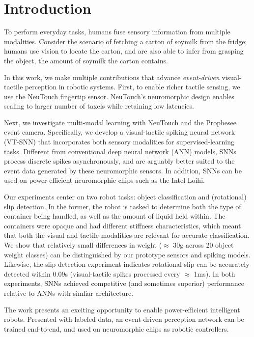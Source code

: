 \documentclass[fyp]{socreport}
\begin{document}
\section{Introduction}

To perform everyday tasks, humans fuse sensory information from multiple modalities. Consider the scenario of fetching a carton of soymilk from the fridge; humans use vision to locate the carton, and are also able to infer from grasping the object, the amount of soymilk the carton contains.

In this work, we make multiple contributions that advance \emph{event-driven} visual-tactile perception in robotic systems. First, to enable richer tactile sensing, we use the NeuTouch fingertip sensor. NeuTouch's neuromorphic design enables scaling to larger number of taxels while retaining low latencies.

Next, we investigate multi-modal learning with NeuTouch and the Prophesee event camera. Specifically, we develop a visual-tactile spiking neural network (VT-SNN) that incorporates both sensory modalities for supervised-learning tasks. Different from conventional deep neural network (ANN) models, SNNs process discrete spikes asynchronously, and are arguably better suited to the event data generated by these neuromorphic sensors. In addition, SNNs can be used on power-efficient neuromorphic chips such as the Intel Loihi\cite{davies2018loihi}.

Our experiments center on two robot tasks: object classification and (rotational) slip detection. In the former, the robot is tasked to determine both the type of container being handled, as well as the amount of liquid held within. The containers were opaque and had different stiffness characteristics, which meant that both the visual and tactile modalities are relevant for accurate classification. We show that relatively small differences in weight ($\approx$ 30g across 20 object weight classes) can be distinguished by our prototype sensors and spiking models. Likewise, the slip detection experiment indicates rotational slip can be accurately detected within 0.09s (visual-tactile spikes processed every $\approx$ 1ms). In both experiments, SNNs achieved competitive (and sometimes superior) performance relative to ANNs with simliar architecture.

The work presents an exciting opportunity to enable power-efficient intelligent robots. Presented with labeled data, an event-driven perception network can be trained end-to-end, and used on  neuromorphic chips as robotic controllers.
\end{document}
